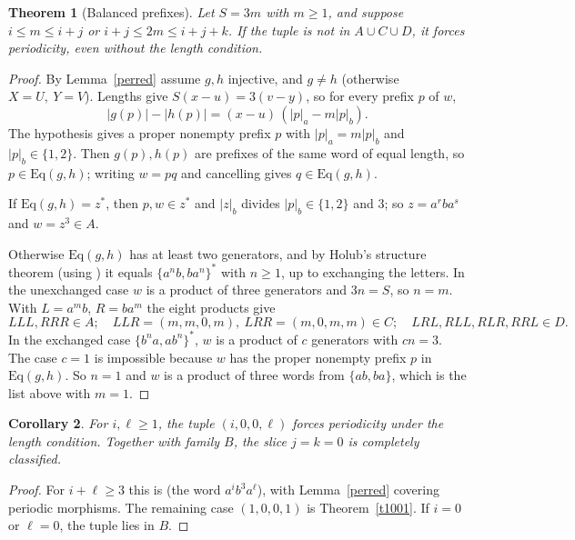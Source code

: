 \documentclass[10pt]{article}
\newtheorem{theorem}{Theorem}
\newtheorem{corollary}[theorem]{Corollary}
\theoremstyle{remark}\newtheorem*{remark}{Remark}
\begin{document}
\begin{theorem}[Balanced prefixes]\label{balanced}
Let \(S=3m\) with \(m\ge1\), and suppose \(i\le m\le i+j\) or \(i+j\le 2m\le i+j+k\). If the tuple is not in \(A\cup C\cup D\), it forces periodicity, even without the length condition.
\end{theorem}
\begin{proof}
By Lemma~\ref{perred} assume \(g,h\) injective, and \(g\ne h\) (otherwise \(X=U,\ Y=V\)). Lengths give \(S(x-u)=3(v-y)\), so for every prefix \(p\) of \(w\),
\[|g(p)|-|h(p)|=(x-u)\,(|p|_a-m|p|_b).\]
The hypothesis gives a proper nonempty prefix \(p\) with \(|p|_a=m|p|_b\) and \(|p|_b\in\{1,2\}\). Then \(g(p),h(p)\) are prefixes of the same word of equal length, so \(p\in\mathrm{Eq}(g,h)\); writing \(w=pq\) and cancelling gives \(q\in\mathrm{Eq}(g,h)\).

If \(\mathrm{Eq}(g,h)=z^*\), then \(p,w\in z^*\) and \(|z|_b\) divides \(|p|_b\in\{1,2\}\) and \(3\); so \(z=a^rba^s\) and \(w=z^3\in A\).

Otherwise \(\mathrm{Eq}(g,h)\) has at least two generators, and by Holub's structure theorem \cite{uniq} (using \cite{gen2}) it equals \(\{a^nb,ba^n\}^*\) with \(n\ge1\), up to exchanging the letters. In the unexchanged case \(w\) is a product of three generators and \(3n=S\), so \(n=m\). With \(L=a^mb\), \(R=ba^m\) the eight products give
\[
LLL,RRR\in A;\quad LLR=(m,m,0,m),\ LRR=(m,0,m,m)\in C;\quad LRL,RLL,RLR,RRL\in D .
\]
In the exchanged case \(\{b^na,ab^n\}^*\), \(w\) is a product of \(c\) generators with \(cn=3\). The case \(c=1\) is impossible because \(w\) has the proper nonempty prefix \(p\) in \(\mathrm{Eq}(g,h)\). So \(n=1\) and \(w\) is a product of three words from \(\{ab,ba\}\), which is the list above with \(m=1\).
\end{proof}

\begin{corollary}\label{outer}
For \(i,\ell\ge1\), the tuple \((i,0,0,\ell)\) forces periodicity under the length condition. Together with family \(B\), the slice \(j=k=0\) is completely classified.
\end{corollary}
\begin{proof}
For \(i+\ell\ge3\) this is \cite[Theorem 1]{hh} (the word \(a^ib^3a^\ell\)), with Lemma~\ref{perred} covering periodic morphisms. The remaining case \((1,0,0,1)\) is Theorem~\ref{t1001}. If \(i=0\) or \(\ell=0\), the tuple lies in \(B\).
\end{proof}
\end{document}
